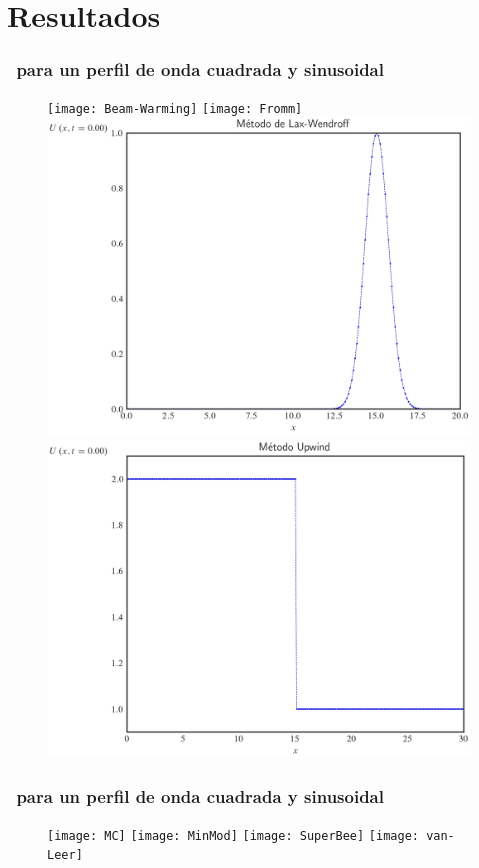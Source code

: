 \section{Resultados} %

\begin{frame}
	\frametitle{\secname~para un perfil de onda cuadrada y sinusoidal}

	\begin{figure}[ht!]
		\centering
		\texttt{[image: Beam-Warming]}
		\texttt{[image: Fromm]}
		\includegraphics[width=.38\paperwidth]{Lax-Wendroff}
		\includegraphics[width=.38\paperwidth]{Upwind}
	\end{figure}
\end{frame}

\begin{frame}
	\frametitle{\secname~para un perfil de onda cuadrada y sinusoidal}
	\begin{figure}[ht!]
		\centering
		\texttt{[image: MC]}
		\texttt{[image: MinMod]}
		\texttt{[image: SuperBee]}
		\texttt{[image: van-Leer]}
	\end{figure}
\end{frame}
